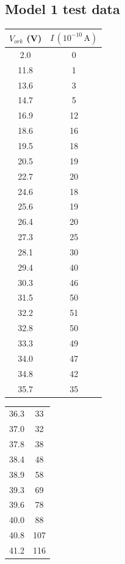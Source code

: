 \documentclass[%
sor,
 jor,
 amsmath,amssymb,
 reprint,
longbibliography,
]{revtex4-2}
\begin{document}
\subsection{Model 1 test data}
\begin{table}[H]
\begin{minipage}[t]{0.48\textwidth}
\centering
\begin{tabular}{|c|c|}
\hline
$V_{ork}$ (V) & $I\,(10^{-10}\,\mathrm{A})$ \\
\hline
2.0  & 0   \\
11.8 & 1   \\
13.6 & 3   \\
14.7 & 5   \\
16.9 & 12  \\
18.6 & 16  \\
19.5 & 18  \\
20.5 & 19  \\
22.7 & 20  \\
24.6 & 18  \\
25.6 & 19  \\
26.4 & 20  \\
27.3 & 25  \\
28.1 & 30  \\
29.4 & 40  \\
30.3 & 46  \\
31.5 & 50  \\
32.2 & 51  \\
32.8 & 50  \\
33.3 & 49  \\
34.0 & 47  \\
34.8 & 42  \\
35.7 & 35  \\
\end{tabular}
\end{minipage}%
\hfill %
\begin{minipage}[t]{0.48\textwidth}
\centering
\begin{tabular}{|c|c|}
36.3 & 33  \\
37.0 & 32  \\
37.8 & 38  \\
38.4 & 48  \\
38.9 & 58  \\
39.3 & 69  \\
39.6 & 78  \\
40.0 & 88  \\
40.8 & 107 \\
41.2 & 116 \\

\end{tabular}
\end{minipage}
\end{table}
\end{document}
